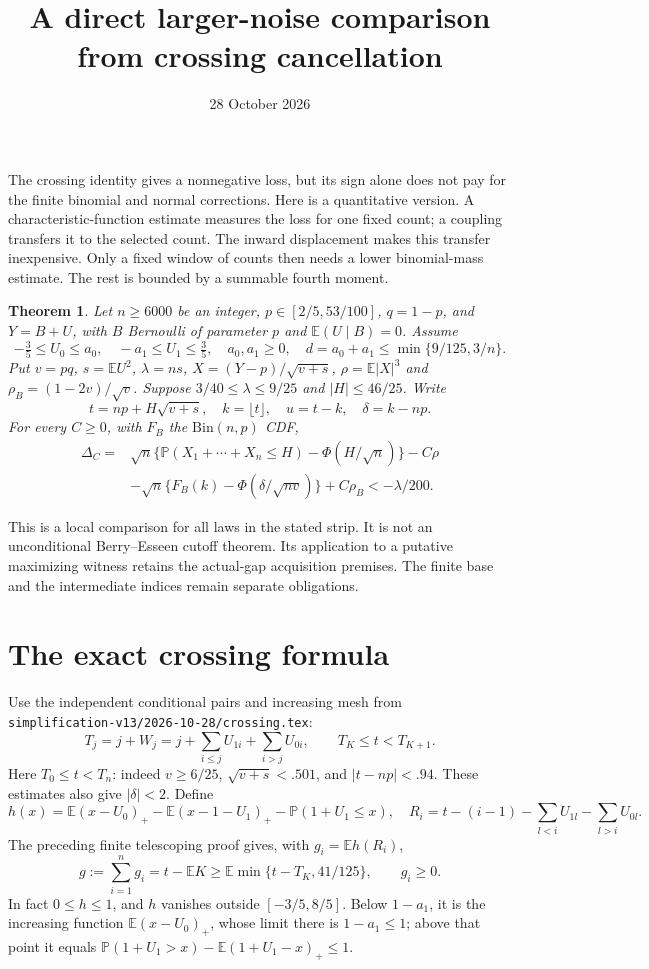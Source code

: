 \documentclass[11pt]{article}
\title{A direct larger-noise comparison from crossing cancellation}
\author{}\date{28 October 2026}
\newtheorem{theorem}{Theorem}\newtheorem{lemma}[theorem]{Lemma}
\newcommand{\E}{\mathbb E}\newcommand{\Pp}{\mathbb P}
\begin{document}
\maketitle

The crossing identity gives a nonnegative loss, but its sign alone does not
pay for the finite binomial and normal corrections. Here is a quantitative
version. A characteristic-function estimate measures the loss for one fixed
count; a coupling transfers it to the selected count. The inward displacement
makes this transfer inexpensive. Only a fixed window of counts then needs a
lower binomial-mass estimate. The rest is bounded by a summable fourth moment.

\begin{theorem}\label{thm:main}
Let $n\ge6000$ be an integer, $p\in[2/5,53/100]$, $q=1-p$, and
$Y=B+U$, with $B$ Bernoulli of parameter $p$ and $\E(U\mid B)=0$.
Assume
\[
 -\tfrac35\le U_0\le a_0,\quad -a_1\le U_1\le\tfrac35,
 \quad a_0,a_1\ge0,\quad d=a_0+a_1\le\min\{9/125,3/n\}.
\]
Put $v=pq$, $s=\E U^2$, $\lambda=ns$, $X=(Y-p)/\sqrt{v+s}$,
$\rho=\E|X|^3$ and $\rho_B=(1-2v)/\sqrt v$. Suppose
$3/40\le\lambda\le9/25$ and $|H|\le46/25$. Write
\[
 t=np+H\sqrt{v+s},\quad k=\lfloor t\rfloor,\quad u=t-k,
 \quad\delta=k-np.
\]
For every $C\ge0$, with $F_B$ the $\mathrm{Bin}(n,p)$ CDF,
\begin{align*}
 \Delta_C={}&\sqrt n\{\Pp(X_1+\cdots+X_n\le H)-\Phi(H/\sqrt n)\}-C\rho\\
 &-\sqrt n\{F_B(k)-\Phi(\delta/\sqrt{nv})\}+C\rho_B
                         <-\lambda/200.
\end{align*}
\end{theorem}

This is a local comparison for all laws in the stated strip. It is not an
unconditional Berry--Esseen cutoff theorem. Its application to a putative
maximizing witness retains the actual-gap acquisition premises. The finite
base and the intermediate indices remain separate obligations.

\section{The exact crossing formula}
Use the independent conditional pairs and increasing mesh from
\texttt{simplification-v13/2026-10-28/crossing.tex}:
\[
 T_j=j+W_j=j+\sum_{i\le j}U_{1i}+\sum_{i>j}U_{0i},
 \qquad T_K\le t<T_{K+1}.
\]
Here $T_0\le t<T_n$: indeed $v\ge6/25$, $\sqrt{v+s}<.501$, and
$|t-np|<.94$. These estimates also give $|\delta|<2$.
Define
\[
 h(x)=\E(x-U_0)_+-\E(x-1-U_1)_+-\Pp(1+U_1\le x),
 \quad R_i=t-(i-1)-\sum_{l<i}U_{1l}-\sum_{l>i}U_{0l}.
\]
The preceding finite telescoping proof gives, with $g_i=\E h(R_i)$,
\begin{equation}\label{eq:age}
 g:=\sum_{i=1}^n g_i=t-\E K
       \ge\E\min\{t-T_K,41/125\},\qquad g_i\ge0.
\end{equation}
In fact $0\le h\le1$, and $h$ vanishes outside $[-3/5,8/5]$.
Below $1-a_1$, it is the increasing function $\E(x-U_0)_+$, whose
limit there is $1-a_1\le1$; above that point it equals
$\Pp(1+U_1>x)-\E(1+U_1-x)_+\le1$.
\end{document}
